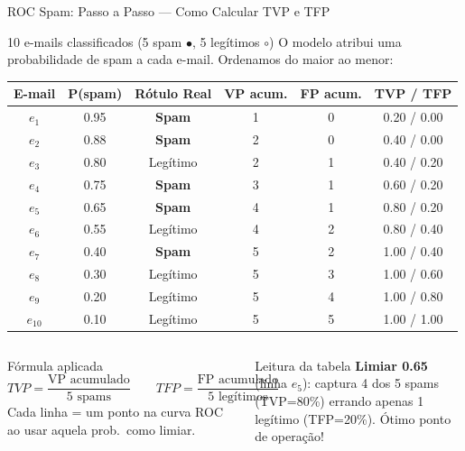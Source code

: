 \documentclass[aspectratio=169]{beamer}
\begin{document}
\begin{frame}[shrink=5]{ROC Spam: Passo a Passo — Como Calcular TVP e TFP}
\begin{block}{10 e-mails classificados (5 spam \textcolor{minered}{$\bullet$}, 5 legítimos \textcolor{mineblue}{$\circ$})}
  \footnotesize
  O modelo atribui uma probabilidade de spam a cada e-mail. Ordenamos do maior ao menor:
  \begin{center}
  \renewcommand{\arraystretch}{1.15}
  \begin{tabular}{cccccc}
  \toprule
  \textbf{E-mail} & \textbf{P(spam)} & \textbf{Rótulo Real} & \textbf{VP acum.} & \textbf{FP acum.} & \textbf{TVP / TFP} \\
  \midrule
  $e_1$ & 0.95 & \textcolor{minered}{\textbf{Spam}}   & 1 & 0 & 0.20 / 0.00 \\
  $e_2$ & 0.88 & \textcolor{minered}{\textbf{Spam}}   & 2 & 0 & 0.40 / 0.00 \\
  $e_3$ & 0.80 & \textcolor{mineblue}{Legítimo}        & 2 & 1 & 0.40 / 0.20 \\
  $e_4$ & 0.75 & \textcolor{minered}{\textbf{Spam}}   & 3 & 1 & 0.60 / 0.20 \\
  $e_5$ & 0.65 & \textcolor{minered}{\textbf{Spam}}   & 4 & 1 & 0.80 / 0.20 \\
  $e_6$ & 0.55 & \textcolor{mineblue}{Legítimo}        & 4 & 2 & 0.80 / 0.40 \\
  $e_7$ & 0.40 & \textcolor{minered}{\textbf{Spam}}   & 5 & 2 & 1.00 / 0.40 \\
  $e_8$ & 0.30 & \textcolor{mineblue}{Legítimo}        & 5 & 3 & 1.00 / 0.60 \\
  $e_9$ & 0.20 & \textcolor{mineblue}{Legítimo}        & 5 & 4 & 1.00 / 0.80 \\
  $e_{10}$ & 0.10 & \textcolor{mineblue}{Legítimo}     & 5 & 5 & 1.00 / 1.00 \\
  \bottomrule
  \end{tabular}
  \end{center}
\end{block}
\vspace{0.2em}
\begin{columns}[T]
\begin{exampleblock}{Fórmula aplicada}
  \footnotesize
  $TVP = \dfrac{\text{VP acumulado}}{5 \text{ spams}} \qquad TFP = \dfrac{\text{FP acumulado}}{5 \text{ legítimos}}$\\[4pt]
  Cada linha = um ponto na curva ROC ao usar aquela prob.\ como limiar.
\end{exampleblock}
\begin{alertblock}{Leitura da tabela}
  \footnotesize
  \textbf{Limiar 0.65} (linha $e_5$): captura 4 dos 5 spams (TVP=80\%) errando apenas 1 legítimo (TFP=20\%). Ótimo ponto de operação!
\end{alertblock}
\end{columns}
\end{frame}
\end{document}
